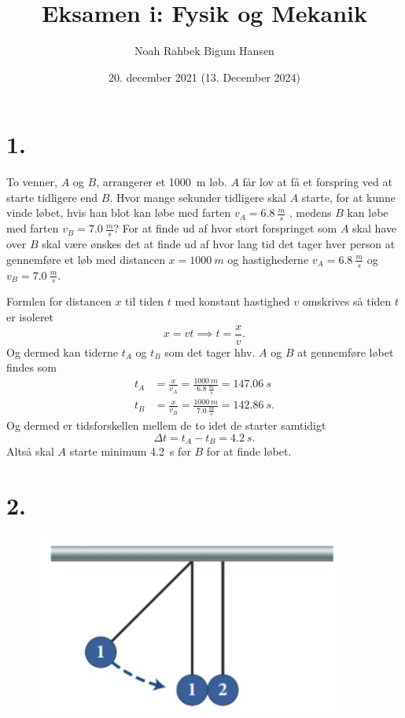 \documentclass[12pt]{article}
\title{Eksamen i: Fysik og Mekanik}
\author{Noah Rahbek Bigum Hansen}
\date{20. december 2021 (13. December 2024)}
\theoremstyle{definition}
\begin{document}
\maketitle

\section*{1.}
To venner, $A$ og $B$, arrangerer et \qty{1000}{m} løb. $A$ får lov at få et forspring ved at starte tidligere end $B$. Hvor mange sekunder tidligere skal $A$ starte, for at kunne vinde løbet, hvis han blot kan løbe med farten $v_A = \qty{6,8}{\frac{m}{s}}$ , medens $B$ kan løbe med farten $v_B = \qty{7,0}{\frac{m}{s}}$?
\bigbreak
For at finde ud af hvor stort forspringet som $A$ skal have over $B$ skal være ønskes det at finde ud af hvor lang tid det tager hver person at gennemføre et løb med distancen $x = \qty{1000}{m}$ og hastighederne $v_A = \qty{6,8}{\frac{m}{s}}$ og $v_B = \qty{7,0}{\frac{m}{s}}$.

Formlen for distancen $x$ til tiden $t$ med konstant hastighed $v$ omskrives så tiden $t$ er isoleret
\[ 
x = vt \implies t = \frac{x}{v}
.\]
Og dermed kan tiderne $t_A$ og $t_B$ som det tager hhv. $A$ og $B$ at gennemføre løbet findes som
\begin{align*}
  t_A &= \frac{x}{v_A} = \frac{\qty{1000}{m}}{\qty{6,8}{\frac{m}{s}}} = \qty{147,06}{s}  \\
  t_B &= \frac{x}{v_B} = \frac{\qty{1000}{m}}{\qty{7,0}{\frac{m}{s}}} = \qty{142,86}{s}
.\end{align*}
Og dermed er tidsforskellen mellem de to idet de starter samtidigt
\[ 
\Delta t = t_A - t_B = \qty{4,2}{s} 
.\]
Altså skal $A$ starte minimum \qty{4,2}{s} før $B$ for at finde løbet.


\section*{2.}
\begin{figure} [ht]
  \centering
  \caption{}
  \includegraphics[width=0.5\linewidth]{../figures/E2122_1.png}
  \label{fig:E2122_1}
\end{figure}
\end{document}
